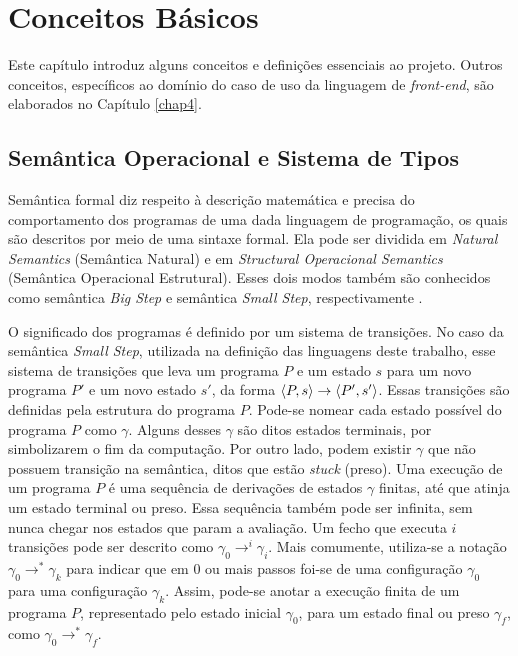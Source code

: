\chapter{Conceitos Básicos} 
\label{chap2}

Este capítulo introduz alguns conceitos e definições essenciais ao projeto. 
Outros conceitos, específicos ao domínio do caso de uso da linguagem de \emph{front-end},
são elaborados no Capítulo \ref{chap4}. 

\section{Semântica Operacional e Sistema de Tipos}

Semântica formal diz respeito à descrição matemática e precisa do comportamento dos programas de uma dada linguagem de programação, os quais são descritos por meio de uma sintaxe formal. Ela pode ser dividida em \emph{Natural Semantics} (Semântica Natural) e em \emph{Structural Operacional Semantics} (Semântica Operacional Estrutural). Esses dois modos também são conhecidos como semântica \emph{Big Step} e semântica \emph{Small Step}, respectivamente \cite{NIELSON}.

O significado dos programas é definido por um sistema de transições. No caso da semântica \emph{Small Step}, utilizada na definição das linguagens deste trabalho, esse sistema de transições que leva um programa $P$ e um estado $s$ para um novo programa $P'$ e um novo estado $s'$, da forma $\langle P, s \rangle \to \langle P', s' \rangle$. Essas transições são definidas pela estrutura do programa $P$. Pode-se nomear cada estado possível do programa $P$ como $\gamma$. Alguns desses $\gamma$ são ditos estados terminais, por simbolizarem o fim da computação. Por outro lado, podem existir $\gamma$ que não possuem transição na semântica, ditos que estão \emph{stuck} (preso). Uma execução de um programa $P$ é uma sequência de derivações de estados $\gamma$ finitas, até que atinja um estado terminal ou preso. Essa sequência também pode ser infinita, sem nunca chegar nos estados que param a avaliação. Um fecho que executa $i$ transições pode ser descrito como $\gamma_0 \to^i \gamma_i$. Mais comumente, utiliza-se a notação $\gamma_0 \to^* \gamma_k$ para indicar que em 0 ou mais passos foi-se de uma configuração $\gamma_0$ para uma configuração $\gamma_k$. Assim, pode-se anotar a execução finita de um programa $P$, representado pelo estado inicial $\gamma_0$, para um estado final ou preso $\gamma_f$, como $\gamma_0 \to^* \gamma_f$.

